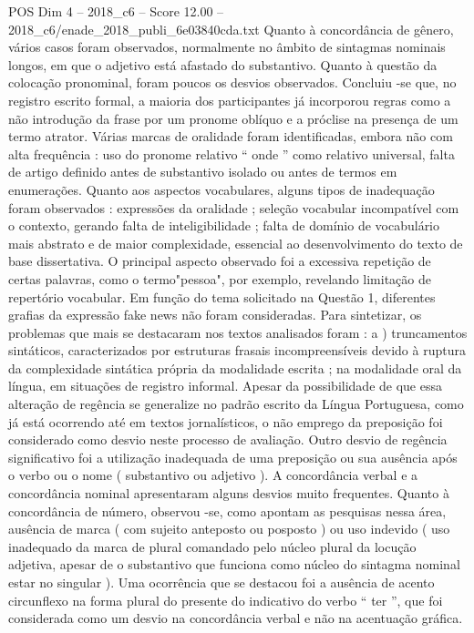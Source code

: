 \begin{textsample}{POS Dim 4 – 2018\_c6 – Score 12.00 – 2018\_c6/enade\_2018\_publi\_6e03840cda.txt}
Quanto à concordância de gênero, vários casos foram observados, normalmente no âmbito de sintagmas nominais longos, em que o adjetivo está afastado do substantivo.
Quanto à questão da colocação pronominal, foram poucos os desvios observados.
Concluiu -se que, no registro escrito formal, a maioria dos participantes já incorporou regras como a não introdução da frase por um pronome oblíquo e a próclise na presença de um termo atrator.
Várias marcas de oralidade foram identificadas, embora não com alta frequência : uso do pronome relativo “ onde ” como relativo universal, falta de artigo definido antes de substantivo isolado ou antes de termos em enumerações.
Quanto aos aspectos vocabulares, alguns tipos de inadequação foram observados : expressões da oralidade ; seleção vocabular incompatível com o contexto, gerando falta de inteligibilidade ; falta de domínio de vocabulário mais abstrato e de maior complexidade, essencial ao desenvolvimento do texto de base dissertativa.
O principal aspecto observado foi a excessiva repetição de certas palavras, como o termo"pessoa", por exemplo, revelando limitação de repertório vocabular.
Em função do tema solicitado na Questão 1, diferentes grafias da expressão fake news não foram consideradas.
Para sintetizar, os problemas que mais se destacaram nos textos analisados foram : a ) truncamentos sintáticos, caracterizados por estruturas frasais incompreensíveis devido à ruptura da complexidade sintática própria da modalidade escrita ; na modalidade oral da língua, em situações de registro informal.
Apesar da possibilidade de que essa alteração de regência se generalize no padrão escrito da Língua Portuguesa, como já está ocorrendo até em textos jornalísticos, o não emprego da preposição foi considerado como desvio neste processo de avaliação.
Outro desvio de regência significativo foi a utilização inadequada de uma preposição ou sua ausência após o verbo ou o nome ( substantivo ou adjetivo ).
A concordância verbal e a concordância nominal apresentaram alguns desvios muito frequentes.
Quanto à concordância de número, observou -se, como apontam as pesquisas nessa área, ausência de marca ( com sujeito anteposto ou posposto ) ou uso indevido ( uso inadequado da marca de plural comandado pelo núcleo plural da locução adjetiva, apesar de o substantivo que funciona como núcleo do sintagma nominal estar no singular ).
Uma ocorrência que se destacou foi a ausência de acento circunflexo na forma plural do presente do indicativo do verbo “ ter ”, que foi considerada como um desvio na concordância verbal e não na acentuação gráfica.

\end{textsample}
